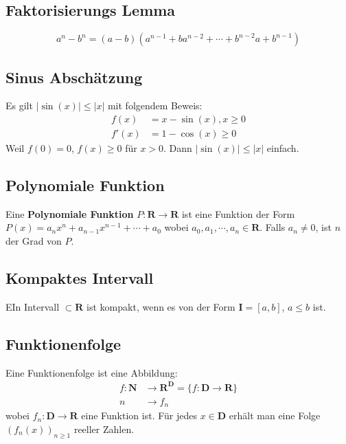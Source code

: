 \documentclass[8pt]{article}
\begin{document}
\begin{multicols*}{3}
\subsection{Faktorisierungs Lemma}

$$
  a^n - b^n = (a-b)(a^{n-1} + ba^{n-2} + \cdots + b^{n-2}a + b^{n-1})
$$

\subsection{Sinus Abschätzung}

Es gilt $|\sin(x)| \leq |x|$ mit folgendem Beweis:
\begin{align*}
  f(x) &= x - \sin(x), x \geq 0 \\
  f'(x) &= 1 - \cos(x) \geq 0
\end{align*}
Weil $f(0) = 0$, $f(x) \geq 0$ für $x > 0$. Dann $|\sin(x)| \leq |x|$ einfach. 

\subsection{Polynomiale Funktion}

Eine \textbf{Polynomiale Funktion} $P:\mathbf{R} \rightarrow \mathbf{R}$ ist eine Funktion
der Form $P(x) = a_nx^n + a_{n-1}x^{n-1} + \cdots + a_0$ wobei $a_0, a_1, \cdots, a_n \in \mathbf{R}$.
Falls $a_n \neq 0$, ist $n$ der Grad von $P$. 

\subsection{Kompaktes Intervall}

EIn Intervall $\subset \mathbf{R}$ ist kompakt, wenn es von der Form $\mathbf{I} = [a, b]$,
$a \leq b$ ist.

\subsection{Funktionenfolge}

Eine Funktionenfolge ist eine Abbildung:
\begin{align*}
  f:\mathbf{N} &\rightarrow \mathbf{R}^\mathbf{D} = \{f:\mathbf{D} \rightarrow \mathbf{R}\}\\
  n &\rightarrow f_n
\end{align*}
wobei $f_n: \mathbf{D} \rightarrow \mathbf{R}$ eine Funktion ist. Für jedes $x \in \mathbf{D}$
erhält man eine Folge $(f_n(x))_{n \geq 1}$ reeller Zahlen.


\end{multicols*}
\end{document}
